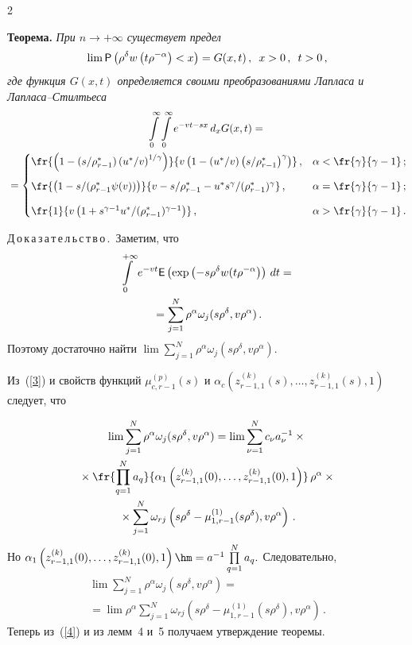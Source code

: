 \begin{multicols}{2}
\medskip

\noindent
\textbf{Теорема.} \textit{При $n\rightarrow +\infty$ существует предел}
$$
\lim{\sf P}\left(\rho^{\delta}w\left(t\rho^{-\alpha}\right)<x\right)=G(x,t)\,,\enskip x>0\,,\enskip t>0\,,
$$
\textit{где функция $G(x,t)$ определяется своими преобразованиями Лапласа и Лап\-ла\-са--Стилть\-еса}
\begin{multline*}
\int\limits_{0}^{\infty}\int\limits_{0}^{\infty}e^{-vt-sx}\,d_xG(x,t)={}\\
{}=
\begin{cases}
\fr{\left(1-({s}/{\rho^*_{r-1}})\left({u^*}/{v}\right)^{{1}/{\gamma}}\right)}
{v\left(1-({u^*}/{v})\left({s}/{\rho^*_{r-1}}\right)^{\gamma}\right)}\,,&\alpha<\fr{\gamma}{\gamma-1}\,;\\[9pt]
\fr{\left(1-{s}/({\rho^*_{r-1}\psi(v)})\right)}{v-{s}/{\rho_{r-1}^*}-
{u^*s^{\gamma}}/{(\rho^{*}_{r-1})^{\gamma}}}\,,& \alpha=\fr{\gamma}{\gamma-1}\,;\\[9pt]
\fr{1}{v\left(1+{s^{\gamma-1}u^*}/{(\rho_{r-1}^*)^{\gamma-1}}\right)}\,,& \alpha>\fr{\gamma}{\gamma-1}\,.
\end{cases}
\end{multline*}

\noindent
Д\,о\,к\,а\,з\,а\,т\,е\,л\,ь\,с\,т\,в\,о\,.\
Заметим, что
\begin{multline*}
\int\limits_{0}^{+\infty}e^{-vt}{\sf E}\left(\exp\left(-s\rho^{\delta}
w(t\rho^{-\alpha}\right)\right)\,dt={}\\
{}=
\sum\limits_{j=1}^N\rho^{\alpha}\omega_{j}(s\rho^{\delta},v\rho^{\alpha})\,.
\end{multline*}
Поэтому достаточно найти 
$\lim \sum\limits_{j=1}^N\rho^{\alpha}\omega_{j}(s\rho^{\delta},v\rho^{\alpha}).$

Из~(\ref{3}) и свойств функций $\mu_{c,r-1}^{(p)}(s)$ и 
$\alpha_c\left(z_{r-1,1}^{(k)}(s),\ldots,z_{r-1,1}^{(k)}(s),1\right)$ следует, что

\noindent
\begin{multline*}
\lim \sum\limits_{j=1}^N\rho^{\alpha}\omega_{j}(s\rho^{\delta},v\rho^{\alpha})=
\lim\sum\limits_{\nu=1}^Nc_{\nu}a_{\nu}^{-1}\times{}\\
{}\times\fr{\prod\limits_{q=1}^Na_q}{\alpha_1\left(z_{r-1,1}^{(k)}(0),\ldots,z_{r-1,1}^{(k)}(0),1\right)}\,
\rho^{\alpha}\times{}\\
{}\times 
\sum\limits_{j=1}^N\omega_{rj}\left(s\rho^{\delta}-\mu_{1,r-1}^{(1)}(s\rho^{\delta}),v\rho^{\alpha}\right)\,.
\end{multline*}
Но $\alpha_1\left(z_{r-1,1}^{(k)}(0),\ldots,z_{r-1,1}^{(k)}(0),1\right)\hm=a^{-1}
\prod\limits_{q=1}^Na_q.$ Следовательно,
\begin{multline*}
\lim \sum\limits_{j=1}^N\rho^{\alpha}\omega_{j}(s\rho^{\delta},v\rho^{\alpha})={}\\
{}=
\lim\rho^{\alpha}\sum\limits_{j=1}^N\omega_{rj}\left(s\rho^{\delta}-\mu_{1,r-1}^{(1)}(s\rho^{\delta}),v\rho^{\alpha}\right)\,.
\end{multline*}
Теперь из~(\ref{4}) и из лемм~4 и~5 получаем утверждение теоремы.


\end{multicols}
